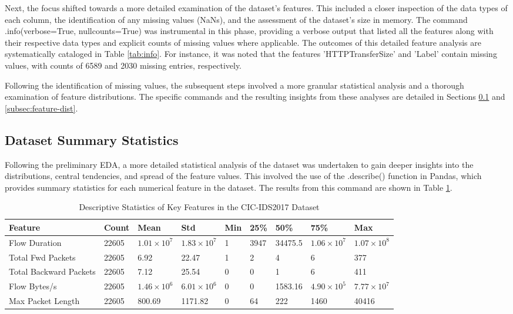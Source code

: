 Next, the focus shifted towards a more detailed examination of the dataset's features. This included a closer inspection of the data types of each column, the identification of any missing values (NaNs), and the assessment of the dataset's size in memory. The command .info(verbose=True, null\textunderscore counts=True) was instrumental in this phase, providing a verbose output that listed all the features along with their respective data types and explicit counts of missing values where applicable. The outcomes of this detailed feature analysis are systematically cataloged in Table \ref{tab:info}. For instance, it was noted that the features 'HTTPTransferSize' and 'Label' contain missing values, with counts of 6589 and 2030 missing entries, respectively.

Following the identification of missing values, the subsequent steps involved a more granular statistical analysis and a thorough examination of feature distributions. The specific commands and the resulting insights from these analyses are detailed in Sections \ref{subsec:ds-summary-statistics} and \ref{subsec:feature-dist}.


\subsection{Dataset Summary Statistics}\label{subsec:ds-summary-statistics} 
Following the preliminary EDA, a more detailed statistical analysis of the dataset was undertaken to gain deeper insights into the distributions, central tendencies, and spread of the feature values. This involved the use of the .describe() function in Pandas, which provides summary statistics for each numerical feature in the dataset. The results from this command are shown in Table \ref{tab:dataset-summary-stats}.

\begin{table}[h!]
	\centering
	\caption{Descriptive Statistics of Key Features in the CIC-IDS2017 Dataset}
	\label{tab:dataset-summary-stats}
	\small
	\begin{tabularx}{\textwidth}{lXXXXXXXX}
		\toprule
		\textbf{Feature} & \textbf{Count} & \textbf{Mean} & \textbf{Std} & \textbf{Min} & \textbf{25\%} & \textbf{50\%} & \textbf{75\%} & \textbf{Max} \\
		\midrule
		Flow Duration & 22605 & $1.01 \times 10^7$ & $1.83 \times 10^7$ & 1 & 3947 & 34475.5 & $1.06 \times 10^7$ & $1.07 \times 10^8$ \\
		Total Fwd Packets & 22605 & 6.92 & 22.47 & 1 & 2 & 4 & 6 & 377 \\
		Total Backward Packets & 22605 & 7.12 & 25.54 & 0 & 0 & 1 & 6 & 411 \\
		Flow Bytes/s & 22605 & $1.46 \times 10^6$ & $6.01 \times 10^6$ & 0 & 0 & 1583.16 & $4.90 \times 10^5$ & $7.77 \times 10^7$ \\
		Max Packet Length & 22605 & 800.69 & 1171.82 & 0 & 64 & 222 & 1460 & 40416 \\
		\bottomrule
	\end{tabularx}
\end{table}
\parencite{sharafaldin2018toward}\\


